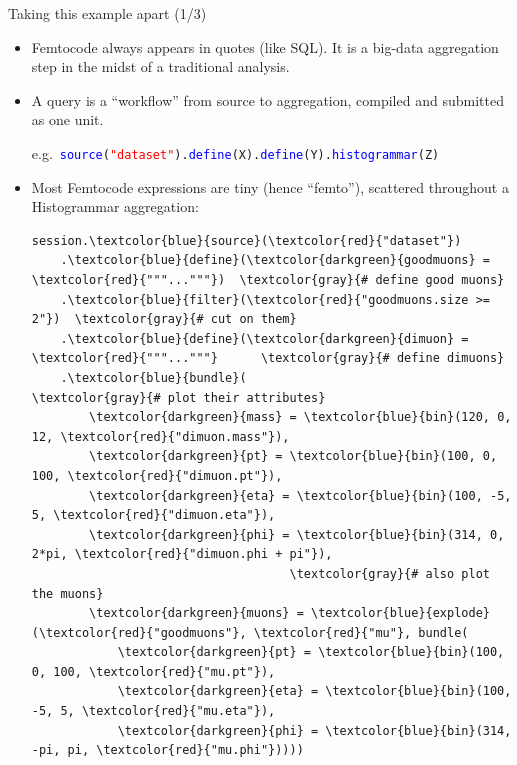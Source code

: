 \documentclass{beamer}
\begin{document}
\begin{frame}[fragile]{Taking this example apart (1/3)}
\vspace{0.25 cm}
\begin{itemize}
\item Femtocode always appears in quotes (like SQL). It is a big-data aggregation step in the midst of a traditional analysis.

\item A query is a ``workflow'' from source to aggregation, compiled and submitted as one unit.

e.g.\ {\tt\scriptsize \textcolor{blue}{source}(\textcolor{red}{"dataset"}).\textcolor{blue}{define}(X).\textcolor{blue}{define}(Y).\textcolor{blue}{histogrammar}(Z) }

\item Most Femtocode expressions are tiny (hence ``femto''), scattered throughout a Histogrammar aggregation:

\scriptsize
\begin{Verbatim}[commandchars=\\\{\}]
session.\textcolor{blue}{source}(\textcolor{red}{"dataset"})
    .\textcolor{blue}{define}(\textcolor{darkgreen}{goodmuons} = \textcolor{red}{"""..."""})  \textcolor{gray}{# define good muons}
    .\textcolor{blue}{filter}(\textcolor{red}{"goodmuons.size >= 2"})  \textcolor{gray}{# cut on them}
    .\textcolor{blue}{define}(\textcolor{darkgreen}{dimuon} = \textcolor{red}{"""..."""}      \textcolor{gray}{# define dimuons}
    .\textcolor{blue}{bundle}(                        \textcolor{gray}{# plot their attributes}
        \textcolor{darkgreen}{mass} = \textcolor{blue}{bin}(120, 0, 12, \textcolor{red}{"dimuon.mass"}),
        \textcolor{darkgreen}{pt} = \textcolor{blue}{bin}(100, 0, 100, \textcolor{red}{"dimuon.pt"}),
        \textcolor{darkgreen}{eta} = \textcolor{blue}{bin}(100, -5, 5, \textcolor{red}{"dimuon.eta"}),
        \textcolor{darkgreen}{phi} = \textcolor{blue}{bin}(314, 0, 2*pi, \textcolor{red}{"dimuon.phi + pi"}),
                                    \textcolor{gray}{# also plot the muons}
        \textcolor{darkgreen}{muons} = \textcolor{blue}{explode}(\textcolor{red}{"goodmuons"}, \textcolor{red}{"mu"}, bundle(
            \textcolor{darkgreen}{pt} = \textcolor{blue}{bin}(100, 0, 100, \textcolor{red}{"mu.pt"}),
            \textcolor{darkgreen}{eta} = \textcolor{blue}{bin}(100, -5, 5, \textcolor{red}{"mu.eta"}),
            \textcolor{darkgreen}{phi} = \textcolor{blue}{bin}(314, -pi, pi, \textcolor{red}{"mu.phi"}))))
\end{Verbatim}
\end{itemize}
\end{frame}
\end{document}
